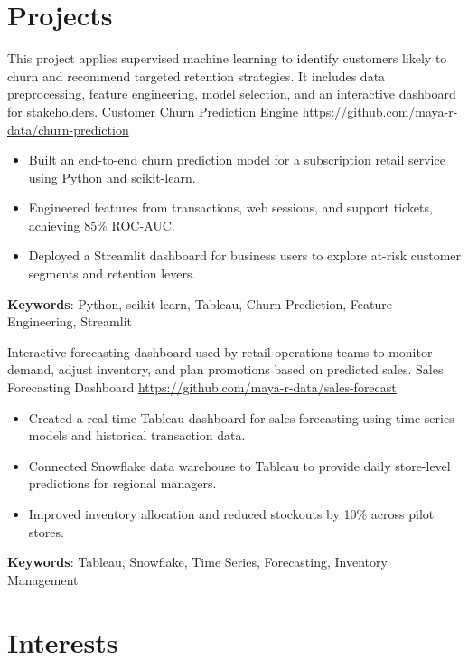 \documentclass[a4paper, serif, 10pt]{moderncv}
\begin{document}
\section{Projects}

        {This project applies supervised machine learning to identify customers likely to churn and recommend targeted retention strategies. It includes data preprocessing, feature engineering, model selection, and an interactive dashboard for stakeholders.
}
        {Customer Churn Prediction Engine}
        {\url{https://github.com/maya-r-data/churn-prediction}}
        {}
        {\begin{itemize}
\item Built an end-to-end churn prediction model for a subscription retail service using Python and scikit-learn.
\item Engineered features from transactions, web sessions, and support tickets, achieving 85\% ROC-AUC.
\item Deployed a Streamlit dashboard for business users to explore at-risk customer segments and retention levers.
\end{itemize}
\textbf{Keywords}: Python, scikit-learn, Tableau, Churn Prediction, Feature Engineering, Streamlit}

        {Interactive forecasting dashboard used by retail operations teams to monitor demand, adjust inventory, and plan promotions based on predicted sales.
}
        {Sales Forecasting Dashboard}
        {\url{https://github.com/maya-r-data/sales-forecast}}
        {}
        {\begin{itemize}
\item Created a real-time Tableau dashboard for sales forecasting using time series models and historical transaction data.
\item Connected Snowflake data warehouse to Tableau to provide daily store-level predictions for regional managers.
\item Improved inventory allocation and reduced stockouts by 10\% across pilot stores.
\end{itemize}
\textbf{Keywords}: Tableau, Snowflake, Time Series, Forecasting, Inventory Management}
\section{Interests}

\end{document}
